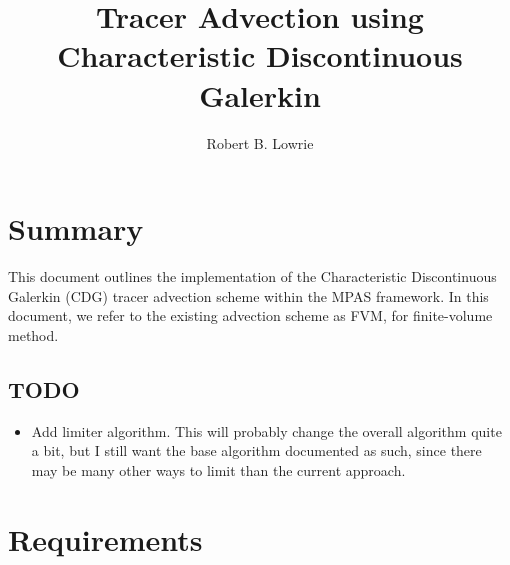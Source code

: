 \documentclass[11pt]{report}
\title{Tracer Advection using Characteristic Discontinuous Galerkin}
\author{Robert B. Lowrie}
\begin{document}
\maketitle

\chapter{Summary}
This document outlines the implementation of the Characteristic Discontinuous
Galerkin (CDG) tracer advection scheme within the MPAS framework.
In this document, we refer to the existing advection scheme as FVM, for
finite-volume method.

\section{TODO}

\begin{itemize}
\item Add limiter algorithm.  This will probably change the overall algorithm
  quite a bit, but I still want the base algorithm documented as such, since
  there may be many other ways to limit than the current approach.
\end{itemize}

\chapter{Requirements}
\end{document}
